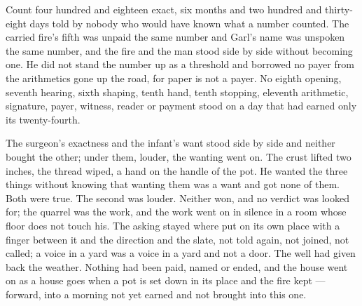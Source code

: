 Count four hundred and eighteen exact, six months and two hundred and thirty-eight days told by nobody who would have known what a number counted. The carried fire's fifth was unpaid the same number and Garl's name was unspoken the same number, and the fire and the man stood side by side without becoming one. He did not stand the number up as a threshold and borrowed no payer from the arithmetics gone up the road, for paper is not a payer. No eighth opening, seventh hearing, sixth shaping, tenth hand, tenth stopping, eleventh arithmetic, signature, payer, witness, reader or payment stood on a day that had earned only its twenty-fourth.

The surgeon's exactness and the infant's want stood side by side and neither bought the other; under them, louder, the wanting went on. The crust lifted two inches, the thread wiped, a hand on the handle of the pot. He wanted the three things without knowing that wanting them was a want and got none of them. Both were true. The second was louder. Neither won, and no verdict was looked for; the quarrel was the work, and the work went on in silence in a room whose floor does not touch his. The asking stayed where put on its own place with a finger between it and the direction and the slate, not told again, not joined, not called; a voice in a yard was a voice in a yard and not a door. The well had given back the weather. Nothing had been paid, named or ended, and the house went on as a house goes when a pot is set down in its place and the fire kept --- forward, into a morning not yet earned and not brought into this one.

